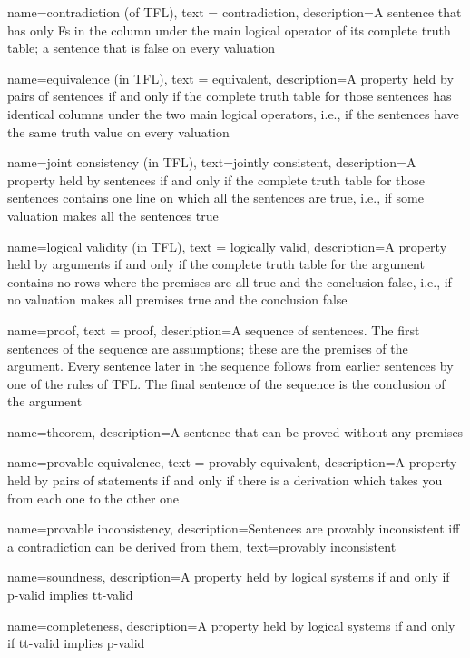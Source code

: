 {
  name=contradiction (of TFL),
  text = contradiction,
description={A sentence that has only Fs in the column under the main logical operator of its \gls{complete truth table}; a sentence that is false on every \gls{valuation}}
}


{
  name=equivalence (in TFL),
  text = equivalent,
description={A property held by pairs of sentences if and only if the \gls{complete truth table} for those sentences has identical columns under the two main logical operators, i.e., if the sentences have the same truth value on every valuation}
}


{
  name=joint consistency (in TFL),
  text=jointly consistent,
description={A property held by sentences if and only if the \gls{complete truth table} for those sentences contains one line on which all the sentences are true, i.e., if some \gls{valuation} makes all the sentences true}
}




{
  name=logical validity (in TFL),
  text = logically valid,
description={A property held by arguments if and only if the \gls{complete truth table} for the argument contains no rows where the \glspl{premise} are all true and the \gls{conclusion} false, i.e., if no \gls{valuation} makes all premises true and the conclusion false}
}



{
  name=proof,
  text = proof,
description={A sequence of sentences. The first sentences of the sequence are assumptions; these are the premises of the argument. Every sentence later in the sequence follows from earlier sentences by one of the rules of TFL. The final sentence of the sequence is the conclusion of the argument}
}



{
name=theorem,
description={A sentence that can be proved without any premises}
}


{
  name=provable equivalence,
  text = provably equivalent,
description={A property held by pairs of statements if and only if there is a derivation which takes you from each one to the other one}
}

{    name={provable inconsistency}, 
  description={Sentences are provably inconsistent iff a contradiction can be derived from them},
    text={provably inconsistent}
}


{
name=soundness,
description={A property held by logical systems if and only if p-valid implies tt-valid}
}


{
name=completeness,
description={A property held by logical systems if and only if tt-valid implies p-valid}
}



